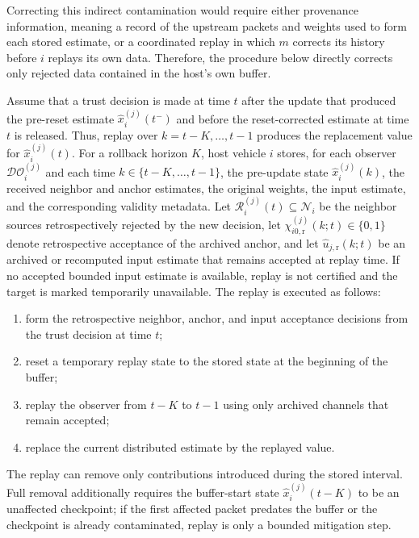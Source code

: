 \documentclass[letterpaper,journal]{IEEEtran}
\def\N{\mathcal{N}} %
\def\DO{\mathcal{DO}} %
\begin{document}
Correcting this indirect contamination would require either provenance information, meaning a record of the upstream packets and weights used to form each stored estimate, or a coordinated replay in which $m$ corrects its history before $i$ replays its own data. Therefore, the procedure below directly corrects only rejected data contained in the host's own buffer.

Assume that a trust decision is made at time $t$ after the update that produced the pre-reset estimate $\hat{x}_i^{(j)}(t^-)$ and before the reset-corrected estimate at time $t$ is released. Thus, replay over $k=t-K,\ldots,t-1$ produces the replacement value for $\hat{x}_i^{(j)}(t)$. For a rollback horizon $K$, host vehicle $i$ stores, for each observer $\DO_i^{(j)}$ and each time $k\in\{t-K,\ldots,t-1\}$, the pre-update state $\hat{x}_i^{(j)}(k)$, the received neighbor and anchor estimates, the original weights, the input estimate, and the corresponding validity metadata. Let $\mathcal{R}_i^{(j)}(t)\subseteq\N_i$ be the neighbor sources retrospectively rejected by the new decision, let $\chi_{i0,\mathrm r}^{(j)}(k;t)\in\{0,1\}$ denote retrospective acceptance of the archived anchor, and let $\hat u_{j,\mathrm r}(k;t)$ be an archived or recomputed input estimate that remains accepted at replay time. If no accepted bounded input estimate is available, replay is not certified and the target is marked temporarily unavailable. The replay is executed as follows:
\begin{enumerate}
    \item form the retrospective neighbor, anchor, and input acceptance decisions from the trust decision at time $t$;
    \item reset a temporary replay state to the stored state at the beginning of the buffer;
    \item replay the observer from $t-K$ to $t-1$ using only archived channels that remain accepted;
    \item replace the current distributed estimate by the replayed value.
\end{enumerate}
The replay can remove only contributions introduced during the stored interval. Full removal additionally requires the buffer-start state $\hat x_i^{(j)}(t-K)$ to be an unaffected checkpoint; if the first affected packet predates the buffer or the checkpoint is already contaminated, replay is only a bounded mitigation step.
\end{document}
